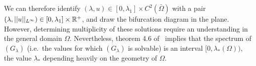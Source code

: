 We can therefore identify $(\lambda,u)\in [0,\lambda_1]\times C^2(\bar\Omega)$
with a pair $(\lambda, ||u||_{L^\infty})\in[0,\lambda_1]\times \mathbb{R}^+$, and draw
the bifurcation diagram in the plane. However, determining multiplicity of these
solutions require an understanding in the general domain $\Omega$. Nevertheless,
theorem 4.6 of~\cite{isoperimetric-inequalities} implies that the spectrum of
$(G_\lambda)$ (i.e.\ the values for which $(G_\lambda)$ is solvable) is an
interval $[0,\lambda_\ast(\Omega))$, the value $\lambda_\ast$ depending heavily
on the geometry of $\Omega$.
